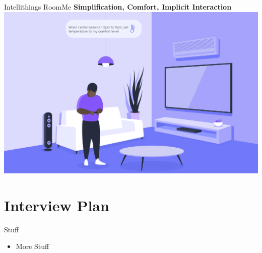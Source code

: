 \documentclass[10pt]{beamer}
\begin{document}
\begin{frame}{Intellithings RoomMe}
	\textbf{Simplification, Comfort, Implicit Interaction}\\
	\vspace{3mm}
	\includegraphics[width=\textwidth]{images/1.png}
\end{frame}


\section{Interview Plan}


\begin{frame}{Stuff}
	\begin{itemize}
        \pause{}
		\item More Stuff
	\end{itemize}	
\end{frame}

 
  

\end{document}
